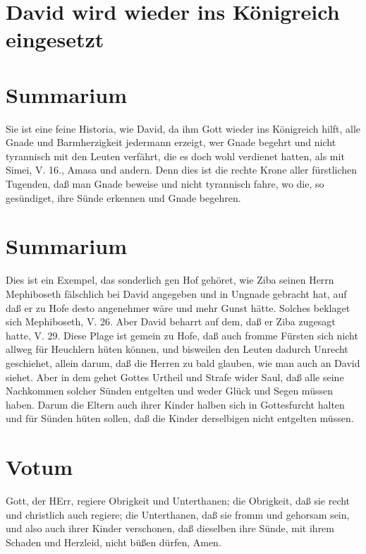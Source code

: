 \section{David wird wieder ins Königreich eingesetzt}

\section{Summarium}

Sie ist eine feine Historia, wie David, da ihm Gott wieder ins Königreich hilft, alle Gnade und Barmherzigkeit jedermann erzeigt, wer Gnade begehrt und nicht tyrannisch mit den Leuten verfährt, die es doch wohl verdienet hatten, als mit Simei, V. 16., Amasa und andern. Denn dies ist die rechte Krone aller fürstlichen Tugenden, daß man Gnade beweise und nicht tyrannisch fahre, wo die, so gesündiget, ihre Sünde erkennen und Gnade begehren.

\section{Summarium}

Dies ist ein Exempel, das sonderlich gen Hof gehöret, wie Ziba seinen Herrn Mephiboseth fälschlich bei David angegeben und in Ungnade gebracht hat, auf daß er zu Hofe desto angenehmer wäre und mehr Gunst hätte. Solches beklaget sich Mephiboseth, V. 26. Aber David beharrt auf dem, daß er Ziba zugesagt hatte, V. 29. Diese Plage ist gemein zu Hofe, daß auch fromme Fürsten sich nicht allweg für Heuchlern hüten können, und bisweilen den Leuten dadurch Unrecht geschiehet, allein darum, daß die Herren zu bald glauben, wie man auch an David siehet. Aber in dem gehet Gottes Urtheil und Strafe wider Saul, daß alle seine Nachkommen solcher Sünden entgelten und weder Glück und Segen müssen haben. Darum die Eltern auch ihrer Kinder halben sich in Gottesfurcht halten und für Sünden hüten sollen, daß die Kinder derselbigen nicht entgelten müssen.

\section{Votum}

Gott, der HErr, regiere Obrigkeit und Unterthanen; die Obrigkeit, daß sie recht und christlich auch regiere; die Unterthanen, daß sie fromm und gehorsam sein, und also auch ihrer Kinder verschonen, daß dieselben ihre Sünde, mit ihrem Schaden und Herzleid, nicht büßen dürfen, Amen.

